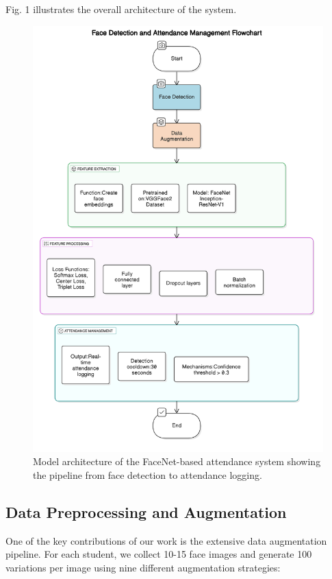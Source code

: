 \documentclass[conference]{IEEEtran}
\begin{document}
Fig. 1 illustrates the overall architecture of the system.

\begin{figure}[htbp]
\centering
\includegraphics[width=\columnwidth]{diagram-export-3-26-2025-7_17_13-PM.png}
\caption{Model architecture of the FaceNet-based attendance system showing the pipeline from face detection to attendance logging.}
\label{fig:model_architecture}
\end{figure}

\subsection{Data Preprocessing and Augmentation}
One of the key contributions of our work is the extensive data augmentation pipeline. For each student, we collect 10-15 face images and generate 100 variations per image using nine different augmentation strategies:
\end{document}
